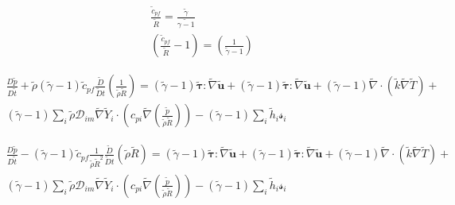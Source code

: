 \documentclass[preprint,12pt,authoryear]{elsarticle}
\begin{document}
\begin{equation}
\begin{split}
	\frac{\tilde{c}_{pf}}{\tilde{R}}=\frac{\tilde{\gamma}}{\tilde{\gamma-1}}
	\\
        \left(
        	\frac{\tilde{c}_{pf}}{\tilde{R}}
		-1
        \right)
	=
        \left(
		\frac{1}{\tilde{\gamma}-1}
        \right)
\end{split}
\end{equation}

\begin{equation}
\begin{split}
        \frac{D \tilde{p}}{D\tilde{t}}
	+
        \tilde{\rho}
	(\tilde{\gamma}-1)
        \tilde{c}_{pf}
        \frac{\tilde{D}}{\tilde{D} t}
        \left(
                \frac{1}{\tilde{\rho}\tilde{R}}
        \right)
        =
	(\tilde{\gamma}-1)
        \pmb{\tilde{\tau}}:\tilde{\nabla} \tilde{\mathbf{u}} 
        + 
	(\tilde{\gamma}-1)
        \pmb{\tilde{\tau}}:\tilde{\nabla} \tilde{\mathbf{u}} 
	+
	(\tilde{\gamma}-1)
        \tilde{\nabla} \cdot (\tilde{k}\tilde{\nabla} \tilde{T})
        +
	\\
	(\tilde{\gamma}-1)
        \sum\limits_i 
        \tilde{\rho}
        \mathcal{D}_{im}
        \tilde{\nabla}
        \tilde{Y}_i     
        \cdot
        \left(
                c_{pi}
                \tilde{\nabla}
                \left(
                	\frac{\tilde{p}}{\tilde{\rho}\tilde{R}}
                \right)
        \right)
	-
	(\tilde{\gamma}-1)
        \sum\limits_i
        \tilde{h}_i
        \mathcal{s}_i	
\end{split}
\end{equation}

\begin{equation}
\begin{split}
        \frac{D \tilde{p}}{D\tilde{t}}
	-
	(\tilde{\gamma}-1)
        \tilde{c}_{pf}
	\frac{1}{\tilde{\rho}\tilde{R}^2}
        \frac{\tilde{D}}{\tilde{D} t}
	(
	\tilde{\rho}\tilde{R}
	)
        =
	(\tilde{\gamma}-1)
        \pmb{\tilde{\tau}}:\tilde{\nabla} \tilde{\mathbf{u}} 
        + 
	(\tilde{\gamma}-1)
        \pmb{\tilde{\tau}}:\tilde{\nabla} \tilde{\mathbf{u}} 
        + 
	(\tilde{\gamma}-1)
        \tilde{\nabla} \cdot (\tilde{k}\tilde{\nabla} \tilde{T})
        +
	\\
	(\tilde{\gamma}-1)
        \sum\limits_i 
        \tilde{\rho}
        \mathcal{D}_{im}
        \tilde{\nabla}
        \tilde{Y}_i     
        \cdot
        \left(
                c_{pi}
                \tilde{\nabla}
                \left(
                	\frac{\tilde{p}}{\tilde{\rho}\tilde{R}}
                \right)
        \right)
	-
	(\tilde{\gamma}-1)
        \sum\limits_i
        \tilde{h}_i
        \mathcal{s}_i	
\end{split}
\end{equation}
\end{document}
